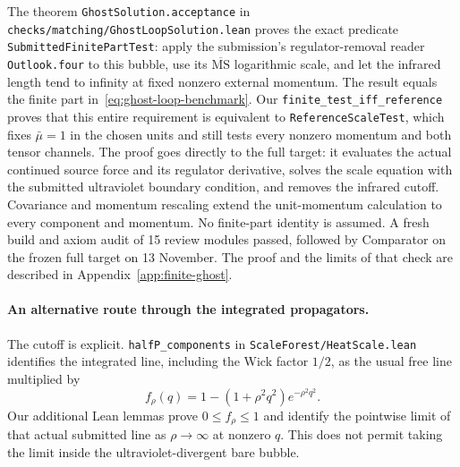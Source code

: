 \documentclass[11pt]{article}
\newcommand{\MS}{\overline{\mathrm{MS}}}
\newcommand{\code}[1]{{\small\nolinkurl{#1}}}
\begin{document}
The theorem \code{GhostSolution.acceptance} in
\code{checks/matching/GhostLoopSolution.lean} proves the exact predicate
\code{SubmittedFinitePartTest}:
apply the submission's regulator-removal reader \code{Outlook.four}
to this bubble, use its $\MS$ logarithmic scale, and let the infrared
length tend to infinity at fixed nonzero external momentum. The result
equals the finite part in~\eqref{eq:ghost-loop-benchmark}.
Our \code{finite_test_iff_reference} proves that this entire requirement
is equivalent to \code{ReferenceScaleTest}, which fixes $\bar\mu=1$
in the chosen units and still tests every nonzero momentum and both
tensor channels. The proof goes directly to the full target: it evaluates
the actual continued source force and its regulator derivative, solves
the scale equation with the submitted ultraviolet boundary condition,
and removes the infrared cutoff. Covariance and momentum rescaling
extend the unit-momentum calculation to every component and momentum.
No finite-part identity is assumed. A fresh build and axiom audit of
15 review modules passed, followed by Comparator on the frozen full
target on 13 November. The proof and the limits of that check are
described in Appendix~\ref{app:finite-ghost}.

\paragraph{An alternative route through the integrated propagators.}
The cutoff is explicit. \code{halfP_components} in
\code{ScaleForest/HeatScale.lean} identifies
the integrated line, including the Wick factor $1/2$, as the usual
free line multiplied by
\[
 f_\rho(q)=1-(1+\rho^2q^2)e^{-\rho^2q^2}.
\]
Our additional Lean lemmas prove $0\le f_\rho\le1$ and identify the
pointwise limit of that actual submitted line as $\rho\to\infty$
at nonzero $q$. This does not permit taking the limit inside the
ultraviolet-divergent bare bubble.
\end{document}
